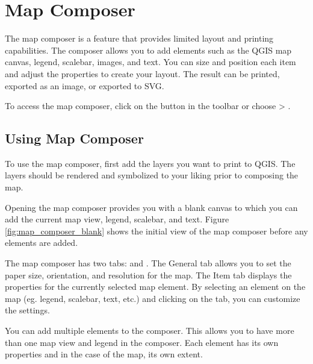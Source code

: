 
\section{Map Composer}\label{label_mapcomposer}

The map composer is a feature that provides limited layout and printing
capabilities. The composer allows you to add elements such as the QGIS map
canvas, legend, scalebar, images, and text. You can size and position each item and
adjust the properties to create your layout. The result can be printed,
exported as an image, or exported to SVG.

To access the map composer, click on the 
button in the toolbar or choose  > .

\subsection{Using Map Composer}\label{label_usemapcomposer} 

To use the map composer, first add the layers you
want to print to QGIS. The layers should be rendered and symbolized to your
liking prior to composing the map. 


Opening the map composer provides you with a blank canvas to which you can add
the current map view, legend, scalebar, and text. Figure
\ref{fig:map_composer_blank} shows the initial view of the map composer before
any elements are added.

The map composer has two tabs:  and . The General tab
allows you to set the paper size, orientation, and resolution for the map.
The Item tab displays the properties for the currently selected map element.
By selecting an element on the map (eg. legend, scalebar, text, etc.) and
clicking on the  tab, you can customize the settings.

You can add multiple elements to the composer. This allows you to have more
than one map view and legend in the composer. Each element has its own
properties and in the case of the map, its own extent.

